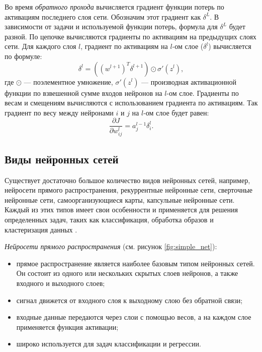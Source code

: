 Во время \textit{обратного прохода} вычисляется градиент функции потерь по активациям последнего слоя сети. Обозначим этот градиент как \(\delta^{L}\). В зависимости от задачи и используемой функции потерь, формула для \(\delta^{L}\) будет разной. По цепочке вычисляются градиенты по активациям на предыдущих слоях сети. Для каждого слоя \(l\), градиент по активациям на \(l\)-ом слое (\(\delta^l\)) вычисляется по формуле: 
\begin{equation}
    \delta^l = ((w^{l+1})^T \delta^{l+1}) \odot \sigma'(z^l),
\end{equation}
где \(\odot\) --- поэлементное умножение, \(\sigma'(z^l)\) --- производная активационной функции по взвешенной сумме входов нейронов на \(l\)-ом слое. Градиенты по весам и смещениям вычисляются с использованием градиента по активациям. Так градиент по весу между нейронами \(i\) и \(j\) на \(l\)-ом слое будет равен: 
\begin{equation}
    \frac{\partial J}{\partial w_{ij}^l} = a_j^{l-1} \delta_i^l.
\end{equation}

\subsection{Виды нейронных сетей}

Существует достаточно большое количество видов нейронных сетей, например, нейросети прямого распространения, рекуррентные нейронные сети, сверточные нейронные сети, самоорганизующиеся карты, капсульные нейронные сети. Каждый из этих типов имеет свои особенности и применяется для решения определенных задач, таких как классификация, обработка образов и кластеризация данных \cite{neurotypes}.

\textit{Нейросети прямого распространения} \cite{ffn} (см. рисунок \ref{fig:simple_net}):
\begin{itemize}
    \item прямое распространение является наиболее базовым типом нейронных сетей. Он состоит из одного или нескольких скрытых слоев нейронов, а также входного и выходного слоев;
    \item сигнал движется от входного слоя к выходному слою без обратной связи;
    \item входные данные передаются через слои с помощью весов, а на каждом слое применяется функция активации;
    \item широко используется для задач классификации и регрессии.
\end{itemize}

